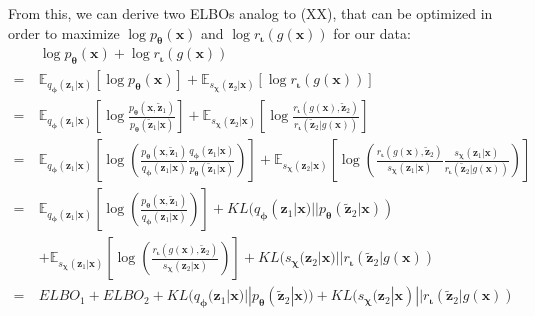 \documentclass[12pt]{report}
\theoremstyle{definition}
\begin{document}
From this, we can derive two ELBOs analog to (XX), that can be optimized in order to maximize $\log p_{\mathbf{\theta}}(\mathbf{x})$ and $\log r_{\mathbf{\iota}}(g(\mathbf{x}))$ for our data:
\begin{equation}
\begin{split}
 & \log p_{\mathbf{\theta}}(\mathbf{x}) + \log r_{\mathbf{\iota}}(g(\mathbf{x}))   \\
	= \ & \mathbb{E}_{q_{\mathbf{\phi}}(\mathbf{z}_1|\mathbf{x})}\left[\log p_{\mathbf{\theta}}(\mathbf{x})\right] + \mathbb{E}_{s_{\mathbf{\chi}}(\mathbf{z}_2|\mathbf{x})}\left[\log r_{\mathbf{\iota}}(g(\mathbf{x}))\right] \\
	= \ & \mathbb{E}_{q_{\mathbf{\phi}}(\mathbf{z}_1|\mathbf{x})}\left[ \log \frac{p_{\mathbf{\theta}}(\mathbf{x}, \tilde{\mathbf{z}}_1)}{p_{\mathbf{\theta}}(\tilde{\mathbf{z}}_1|\mathbf{x})} \right] 
	+ \mathbb{E}_{s_{\mathbf{\chi}}(\mathbf{z}_2|\mathbf{x})}\left[ \log \frac{r_{\mathbf{\iota}}(g(\mathbf{x}), \tilde{\mathbf{z}}_2)}{r_{\mathbf{\iota}}(\tilde{\mathbf{z}}_2|g(\mathbf{x}))} \right] \\
	= \ & \mathbb{E}_{q_{\mathbf{\phi}}(\mathbf{z}_1|\mathbf{x})}\left[ \log \left( \frac{p_{\mathbf{\theta}}(\mathbf{x}, \tilde{\mathbf{z}}_1)}{q_{\mathbf{\phi}}(\mathbf{z}_1|\mathbf{x})}\frac{q_{\mathbf{\phi}}(\mathbf{z}_1|\mathbf{x})}{p_{\mathbf{\theta}}(\tilde{\mathbf{z}}_1|\mathbf{x})}\right) \right] 
	+ \mathbb{E}_{s_{\mathbf{\chi}}(\mathbf{z}_2|\mathbf{x})}\left[ \log \left( \frac{r_{\mathbf{\iota}}(g(\mathbf{x}), \tilde{\mathbf{z}}_2)}{s_{\mathbf{\chi}}(\mathbf{z}_1|\mathbf{x})}\frac{s_{\mathbf{\chi}}(\mathbf{z}_1|\mathbf{x})}{r_{\mathbf{\iota}}(\tilde{\mathbf{z}}_2|g(\mathbf{x}))} \right) \right] \\
	= \ & \mathbb{E}_{q_{\mathbf{\phi}}(\mathbf{z}_1|\mathbf{x})}\left[ \log\left(\frac{p_{\mathbf{\theta}}(\mathbf{x}, \tilde{\mathbf{z}}_1)}{q_{\mathbf{\phi}}(\mathbf{z}_1|\mathbf{x})}\right) \right] + KL(q_{\mathbf{\phi}}(\mathbf{z}_1|\mathbf{x}) || p_{\mathbf{\theta}}(\tilde{\mathbf{z}}_2| \mathbf{x})) \\
	& + \mathbb{E}_{s_{\mathbf{\chi}}(\mathbf{z}_1|\mathbf{x})}\left[ \log\left(\frac{r_{\mathbf{\iota}}(g(\mathbf{x}), \tilde{\mathbf{z}}_2)}{s_{\mathbf{\chi}}(\mathbf{z}_2|\mathbf{x})}\right) \right] + KL(s_{\mathbf{\chi}}(\mathbf{z}_2|\mathbf{x}) || r_{\mathbf{\iota}}(\tilde{\mathbf{z}}_2| g(\mathbf{x})) \\
= \ & ELBO_1 + ELBO_2 + KL(q_{\mathbf{\phi}}(\mathbf{z}_1|\mathbf{x}) || p_{\mathbf{\theta}}(\tilde{\mathbf{z}}_2| \mathbf{x})) + KL(s_{\mathbf{\chi}}(\mathbf{z}_2|\mathbf{x}) || r_{\mathbf{\iota}}(\tilde{\mathbf{z}}_2| g(\mathbf{x}))
\end{split}
\end{equation}
\end{document}
